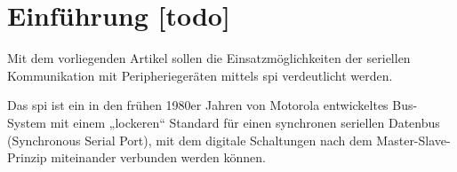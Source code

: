 \begin{comment}
			- In order for this information to be available to the command centre, one or more of the first responders will need to be linked wirelessly to the command vehicle outside the building.
			- If absolute location is required then at least two nodes that are in known locations relative to the building are required. These would need to be “dropped” by the first responders or their support crew on arrival at the building and their locations noted
- \cite{decawave2016dw1kusermanual}
	- Infrastructure based asset tracking
		- Each tag can now calculate its distance from the anchor after a sequence of just 7 messages. If the anchor had used symmetric S-TWR it would be forced to have the same delay for each tag interaction and a minimum of 3 messages per tag, or 15 messages would be required.
		- In the asymmetric case the number of packets required is N+2 whereas in the symmetric case it is 3N.
	- Infrastructure based asset tracking
		- In this scheme a mobile tag (on an asset say) ranges to three fixed anchors. Each anchor then calculates the distance to the tag. These three distances are then combined in an infrastructure-based solver to locate the tag.
		- In the asymmetric ranging scheme the tag sends a Poll message which is received by the three anchors in the infrastructure who reply in successive responses with packets RespA, RespB & RespC after which the tag sends the Final message received by all three anchors. This allows the tag to be located after sending only 2 messages and receiving 3. This scheme is illustrated in Figure 39.
		- This represents a substantial saving in message traffic thereby saving battery power and air-time.
	- Infrastructure-less Peer-to-peer networks
	
\end{comment}



\chapter{Einführung [todo]}

Mit dem vorliegenden Artikel sollen die Einsatzmöglichkeiten der seriellen Kommunikation mit Peripheriegeräten mittels \gls{spi} verdeutlicht werden.

Das \gls{spi} ist ein in den frühen 1980er Jahren von Motorola entwickeltes Bus-System mit einem „lockeren“ Standard für einen synchronen seriellen Datenbus (Synchronous Serial Port), mit dem digitale Schaltungen nach dem Master-Slave-Prinzip miteinander verbunden werden können.

